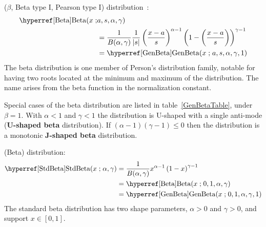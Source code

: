 

\label{sec:Beta}




 ($\beta$, Beta type I, Pearson type I) distribution~\cite{Pearson1895}:
\begin{align}
\label{Beta}
\opr{Beta}(x\given &a,s,\alpha, \gamma) \\
& = 
 \frac{1}{B(\alpha, \gamma)}\frac{1}{ \left|s\right|}
\left(\frac{x-a}{s} \right)^{\alpha -1} \left (1-\left(\frac{x-a}{s}\right)\right)^{\gamma -1}	\checked
\notag
\\ & = \opr{GenBeta}(x\given a,s,\alpha, \gamma,1) \notag						\checked
\end{align}
The beta distribution is one member of Person's distribution family, notable for having two roots located at the minimum and maximum of the distribution. The name arises from the beta function in the normalization constant.





Special cases of the beta  distribution are listed in table~\ref{GenBetaTable}, under $\beta=1$.
With $\alpha<1$ and $\gamma<1$ the distribution is U-shaped with a single anti-mode ({\bf U-shaped beta} distribution). If $(\alpha-1)(\gamma-1)\leq 0$ then the distribution is a  monotonic {\bf J-shaped beta} distribution. 


 (Beta) distribution: 
\begin{align}
\label{StdBeta}
\opr{StdBeta}(x\given \alpha, \gamma) &= 
 \frac{1}{B(\alpha, \gamma)} 
x^{\alpha-1} \left (1- x\right)^{\gamma -1}								\checked
\\ & = \opr{Beta}(x\given  0,1,\alpha,\gamma) \notag						\checked
\\ & = \opr{GenBeta}(x\given  0,1,\alpha,\gamma, 1) \notag				\checked
\end{align}
The standard beta distribution has two shape parameters, $\alpha>0$ and $\gamma>0$, and support $x\in[0,1]$. 


